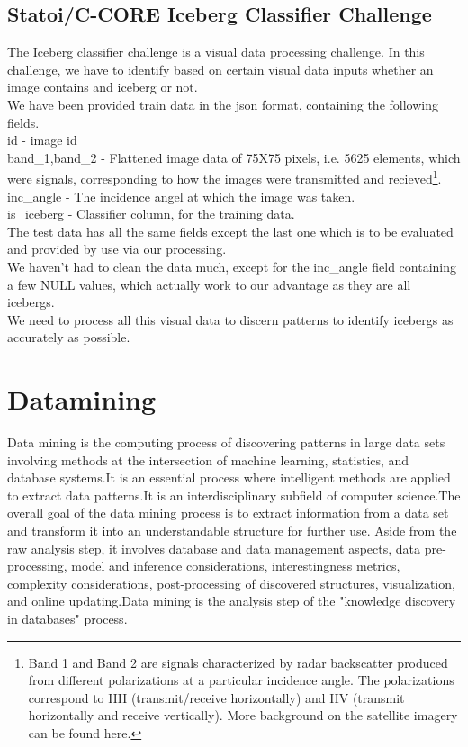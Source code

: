 \documentclass[fleqn,10pt]{SelfArx} %
\begin{document}
\subsection{Statoi/C-CORE Iceberg Classifier Challenge}
The Iceberg classifier challenge is a visual data processing challenge. In this challenge, we have to identify based on certain visual data inputs whether an image contains and iceberg or not.\\
We have been provided train data in the json format, containing the following fields.\\
id - image id\\
band\_1,band\_2 - Flattened image data of 75X75 pixels, i.e. 5625 elements, which were signals, corresponding to how the images were transmitted and recieved\footnote{Band 1 and Band 2 are signals characterized by radar backscatter produced from different polarizations at a particular incidence angle. The polarizations correspond to HH (transmit/receive horizontally) and HV (transmit horizontally and receive vertically). More background on the satellite imagery can be found here.}.\\
inc\_angle - The incidence angel at which the image was taken.\\
is\_iceberg - Classifier column, for the training data.\\
The test data has all the same fields except the last one which is to be evaluated and provided by use via our processing.\\
We haven't had to clean the data much, except for the inc\_angle field containing a few NULL values, which actually work to our advantage as they are all icebergs.\\
We need to process all this visual data to discern patterns to identify icebergs as accurately as possible.
\section{Datamining}
Data mining is the computing process of discovering patterns in large data sets involving methods at the intersection of machine learning, statistics, and database systems.It is an essential process where intelligent methods are applied to extract data patterns.It is an interdisciplinary subfield of computer science.The overall goal of the data mining process is to extract information from a data set and transform it into an understandable structure for further use. Aside from the raw analysis step, it involves database and data management aspects, data pre-processing, model and inference considerations, interestingness metrics, complexity considerations, post-processing of discovered structures, visualization, and online updating.Data mining is the analysis step of the "knowledge discovery in databases" process.\
\end{document}
